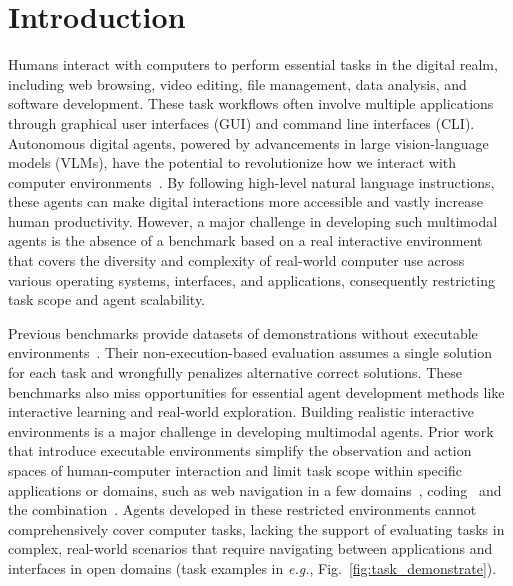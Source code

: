 \section{Introduction}
\vspace{-5pt}

Humans interact with computers to perform essential tasks in the digital realm, including web browsing, video editing, file management, data analysis, and software development.
These task workflows often involve multiple applications through graphical user interfaces (GUI) and command line interfaces (CLI). 
Autonomous digital agents, powered by advancements in large vision-language models (VLMs), have the potential to revolutionize how we interact with computer environments~\citep{licklider1960man, shi2017world, adept2022act1}. 
By following high-level natural language instructions, these agents can make digital interactions more accessible and vastly increase human productivity. 
However, a major challenge in developing such multimodal agents is the absence of a benchmark based on a real interactive environment that covers the diversity and complexity of real-world computer use across various operating systems, interfaces, and applications, consequently restricting task scope and agent scalability.

Previous benchmarks provide datasets of demonstrations without executable environments~\citep{deng2023mind2web, rawles2023android, Kapoor2024OmniACTAD}.
Their non-execution-based evaluation assumes a single solution for each task and wrongfully penalizes alternative correct solutions.
These benchmarks also miss opportunities for essential agent development methods like interactive learning and real-world exploration.
Building realistic interactive environments is a major challenge in developing multimodal agents.
Prior work that introduce executable environments simplify the observation and action spaces of human-computer interaction and limit task scope within specific applications or domains, such as web navigation in a few domains~\citep{shi2017world, liu2018reinforcement, yao2022webshop, zhou2023webarena}, coding~\citep{yang2023intercode} and the combination~\citep{liu2023agentbench, TianbaoXie2023_OpenAgents, ma2024agentboard}.
Agents developed in these restricted environments cannot comprehensively cover computer tasks, lacking the support of evaluating tasks in complex, real-world scenarios that require navigating between applications and interfaces in open domains (task examples in \textit{e.g.}, Fig.~\ref{fig:task_demonstrate}).


